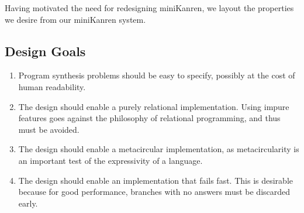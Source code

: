 Having motivated the need for redesigning miniKanren, we layout the properties
we desire from our miniKanren system.
\subsection{Design Goals}
\begin{enumerate}
  \item Program synthesis problems should be easy to specify, possibly at the
    cost of human readability.
  \item The design should enable a purely relational implementation. Using
    impure features goes against the philosophy of relational programming, and
    thus must be avoided.
  \item The design should enable a metacircular implementation, as
    metacircularity is an important test of the expressivity of a language.
  \item The design should enable an implementation that fails fast. This is
    desirable because for good performance, branches with no answers
    must be discarded early.
\end{enumerate}
